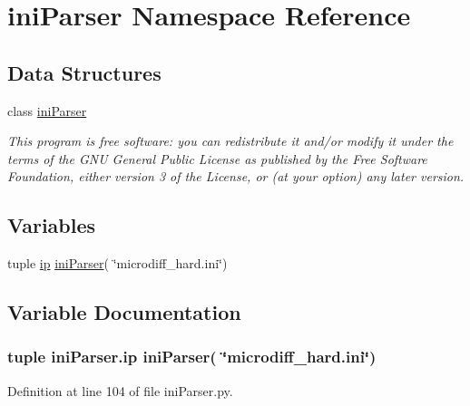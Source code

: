 \hypertarget{namespaceiniParser}{\section{ini\-Parser Namespace Reference}
\label{namespaceiniParser}
}
\subsection*{Data Structures}
\begin{DoxyCompactItemize}
\item 
class \hyperlink{classiniParser_1_1iniParser}{ini\-Parser}
\begin{DoxyCompactList}\small\item\em This program is free software\-: you can redistribute it and/or modify it under the terms of the G\-N\-U General Public License as published by the Free Software Foundation, either version 3 of the License, or (at your option) any later version. \end{DoxyCompactList}\end{DoxyCompactItemize}
\subsection*{Variables}
\begin{DoxyCompactItemize}
\item 
tuple \hyperlink{namespaceiniParser_ac1ed4e851042909f1667bbf67fb9b8d7}{ip} \hyperlink{classiniParser_1_1iniParser}{ini\-Parser}( \char`\"{}microdiff\-\_\-hard.\-ini\char`\"{})
\end{DoxyCompactItemize}


\subsection{Variable Documentation}
\hypertarget{namespaceiniParser_ac1ed4e851042909f1667bbf67fb9b8d7}{
\subsubsection[{ip}]{\setlength{\rightskip}{0pt plus 5cm}tuple ini\-Parser.\-ip {\bf ini\-Parser}( \char`\"{}microdiff\-\_\-hard.\-ini\char`\"{})}}\label{namespaceiniParser_ac1ed4e851042909f1667bbf67fb9b8d7}


Definition at line 104 of file ini\-Parser.\-py.

